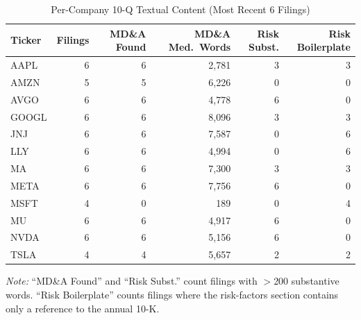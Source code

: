 \begin{table}[htbp]
\centering
\caption{Per-Company 10-Q Textual Content (Most Recent 6 Filings)}
\label{tab:text_per_company}
\small
\begin{tabular}{lrrrrr}
\toprule
Ticker & Filings & MD\&A Found & MD\&A Med.\ Words & Risk Subst. & Risk Boilerplate \\
\midrule
AAPL & 6 & 6 & 2,781 & 3 & 3 \\
AMZN & 5 & 5 & 6,226 & 0 & 0 \\
AVGO & 6 & 6 & 4,778 & 6 & 0 \\
GOOGL & 6 & 6 & 8,096 & 3 & 3 \\
JNJ & 6 & 6 & 7,587 & 0 & 6 \\
LLY & 6 & 6 & 4,994 & 0 & 6 \\
MA & 6 & 6 & 7,300 & 3 & 3 \\
META & 6 & 6 & 7,756 & 6 & 0 \\
MSFT & 4 & 0 & 189 & 0 & 4 \\
MU & 6 & 6 & 4,917 & 6 & 0 \\
NVDA & 6 & 6 & 5,156 & 6 & 0 \\
TSLA & 4 & 4 & 5,657 & 2 & 2 \\
\bottomrule
\end{tabular}
\begin{tablenotes}
\small
\item \textit{Note:} ``MD\&A Found'' and ``Risk Subst.'' count filings with $>$200
substantive words. ``Risk Boilerplate'' counts filings where the risk-factors section
contains only a reference to the annual 10-K.
\end{tablenotes}
\end{table}
